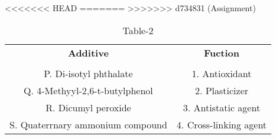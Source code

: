 \begin{table}[htbp]
  \centering
  \caption{Table-2}
<<<<<<< HEAD
  \label{tab:tables/table2.tex}
=======
  \label{table2}
>>>>>>> d734831 (Assignment)
  \begin{tabular}{cc}
  \textbf{Additive} & \textbf{Fuction} \\ \\
    P. Di-isotyl phthalate & 1. Antioxidant \\
    Q. 4-Methyyl-2,6-t-butylphenol & 2. Plasticizer \\
    R. Dicumyl peroxide & 3. Antistatic agent \\
    S. Quaterrnary ammonium compound & 4. Cross-linking agent \\
  \end{tabular}
\end{table}